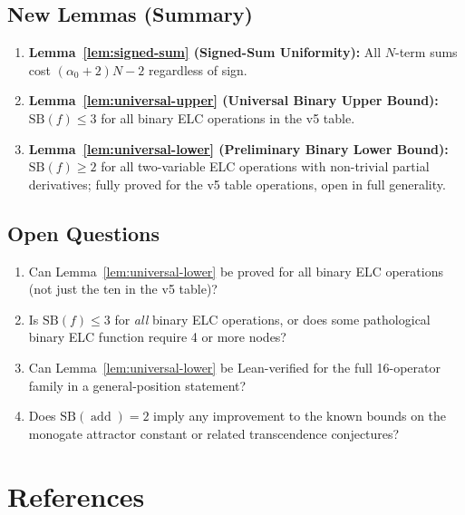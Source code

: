 \documentclass[12pt,a4paper]{article}
\theoremstyle{definition}
\newcommand{\addop}{\operatorname{add}}
\newcommand{\SB}{\mathrm{SB}}
\begin{document}
\subsection{New Lemmas (Summary)}

\begin{enumerate}
\item \textbf{Lemma~\ref{lem:signed-sum} (Signed-Sum Uniformity):}
  All $N$-term sums cost $(\alpha_0+2)N-2$ regardless of sign.

\item \textbf{Lemma~\ref{lem:universal-upper} (Universal Binary Upper Bound):}
  $\SB(f)\leq 3$ for all binary ELC operations in the v5 table.

\item \textbf{Lemma~\ref{lem:universal-lower} (Preliminary Binary Lower Bound):}
  $\SB(f)\geq 2$ for all two-variable ELC operations with non-trivial partial derivatives;
  fully proved for the v5 table operations, open in full generality.
\end{enumerate}

\subsection{Open Questions}

\begin{enumerate}
\item Can Lemma~\ref{lem:universal-lower} be proved for all binary ELC operations
  (not just the ten in the v5 table)?

\item Is $\SB(f)\leq 3$ for \emph{all} binary ELC operations,
  or does some pathological binary ELC function require 4 or more nodes?

\item Can Lemma~\ref{lem:universal-lower} be Lean-verified for the full
  16-operator family in a general-position statement?

\item Does $\SB(\addop)=2$ imply any improvement to the known bounds on
  the monogate attractor constant or related transcendence conjectures?
\end{enumerate}

\section*{References}
\end{document}
